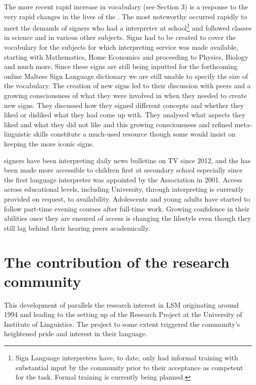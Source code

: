 \documentclass[output=paper]{langsci/langscibook}
\begin{document}
The more recent rapid increase in  vocabulary (see Section 3) is a
response to the very rapid changes in the lives of the .  The most
noteworthy  occurred rapidly to meet the demands
of signers who had a  interpreter at
school\footnote{Sign Language interpreters have, to date, only had
  informal training with substantial input by the  community prior
  to their acceptance as competent for the task.  Formal training is
  currently being planned.} and followed classes in science and in
various other subjects.  Signs had to be created to cover the
vocabulary for the subjects for which  interpreting
service was made available, starting with Mathematics, Home Economics
and proceeding to Physics, Biology and much more.  Since these signs
are still being inputted for the forthcoming online Maltese Sign
Language dictionary we are still unable to specify the size of the
vocabulary.  The creation of new signs led to their discussion with
peers and a growing consciousness of what they were involved in when
they needed to create new signs.  They discussed how they signed
different concepts and whether they liked or disliked what they had
come up with. They analysed what aspects they liked and what they did
not like and this growing consciousness and refined meta-linguistic
skills constitute a much-used resource though some would insist on keeping the
more iconic signs.

 signers have been interpreting daily news bulletins on TV since
2012, and the  has been made more accessible to 
children first at secondary school especially since the first 
language interpreter was appointed by the  Association in
2001. Access across educational levels, including University, through
 interpreting is currently provided on request, 
to availability.  Adolescents and young adults have started to follow
part-time evening courses after full-time work.  Growing confidence in
their abilities once they are ensured of access is changing the
 lifestyle even though they still lag behind their hearing peers
academically.

\section{The contribution of the research community}

This development of  parallels the research
interest in LSM originating around 1994 and leading to the setting up
of the  Research Project at the University of
 Institute of Linguistics.  The project to some extent triggered
the  community’s heightened pride and interest in their 
language.
\end{document}
